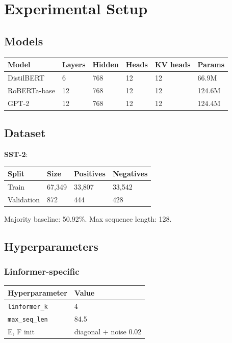 \section{Experimental Setup}

\subsection{Models}

\begin{table}[H]
\centering
\small
\begin{tabular}{llllll}
\toprule
\textbf{Model} & \textbf{Layers} & \textbf{Hidden} & \textbf{Heads} & \textbf{KV heads} & \textbf{Params} \\
\midrule
DistilBERT & 6 & 768 & 12 & 12 & 66.9M \\
RoBERTa-base & 12 & 768 & 12 & 12 & 124.6M \\
GPT-2 & 12 & 768 & 12 & 12 & 124.4M \\
\bottomrule
\end{tabular}
\end{table}

\subsection{Dataset}

\textbf{SST-2}:

\begin{table}[H]
\centering
\small
\begin{tabular}{llll}
\toprule
\textbf{Split} & \textbf{Size} & \textbf{Positives} & \textbf{Negatives} \\
\midrule
Train & 67,349 & 33,807 & 33,542 \\
Validation & 872 & 444 & 428 \\
\bottomrule
\end{tabular}
\end{table}

Majority baseline: 50.92\%. Max sequence length: 128.

\subsection{Hyperparameters}

\subsubsection{Linformer-specific}

\begin{table}[H]
\centering
\small
\begin{tabular}{ll}
\toprule
\textbf{Hyperparameter} & \textbf{Value} \\
\midrule
\texttt{linformer\_k} & 4 \\
\texttt{max\_seq\_len} & 84.5 \\
E, F init & diagonal + noise 0.02 \\
\bottomrule
\end{tabular}
\end{table}

